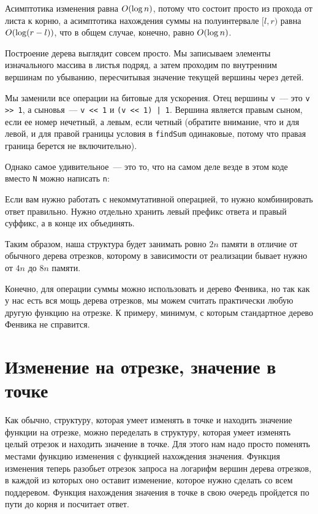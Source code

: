 Асимптотика изменения равна $O(\log n)$, потому что состоит просто из прохода от листа к корню, а асимптотика нахождения суммы на полуинтервале $[l, r)$ равна $O(\log (r - l))$, что в общем случае, конечно, равно $O(\log n)$.

Построение дерева выглядит совсем просто. Мы записываем элементы изначального массива в листья подряд, а затем проходим по внутренним вершинам по убыванию, пересчитывая значение текущей вершины через детей.



Мы заменили все операции на битовые для ускорения. Отец вершины \verb+v+~--- это \verb+v >> 1+, а сыновья~--- \verb+v << 1+ и \verb+(v << 1) | 1+. Вершина является правым сыном, если ее номер нечетный, а левым, если четный (обратите внимание, что и для левой, и для правой границы условия в \verb+findSum+ одинаковые, потому что правая граница берется не включительно).

Однако самое удивительное~--- это то, что на самом деле везде в этом коде вместо \verb+N+ можно написать \verb+n+:



\begin{observation}
    Если вам нужно работать с некоммутативной операцией, то нужно комбинировать ответ правильно. Нужно отдельно хранить левый префикс ответа и правый суффикс, а в конце их объединять.
\end{observation}

Таким образом, наша структура будет занимать ровно $2n$ памяти в отличие от обычного дерева отрезков, которому в зависимости от реализации бывает нужно от $4n$ до $8n$ памяти.

Конечно, для операции суммы можно использовать и дерево Фенвика, но так как у нас есть вся мощь дерева отрезков, мы можем считать практически любую другую функцию на отрезке. К примеру, минимум, с которым стандартное дерево Фенвика не справится.

\section{Изменение на отрезке, значение в точке}

Как обычно, структуру, которая умеет изменять в точке и находить значение функции на отрезке, можно переделать в структуру, которая умеет изменять целый отрезок и находить значение в точке. Для этого нам надо просто поменять местами функцию изменения с функцией нахождения значения. Функция изменения теперь разобьет отрезок запроса на логарифм вершин дерева отрезков, в каждой из которых оно оставит изменение, которое нужно сделать со всем поддеревом. Функция нахождения значения в точке в свою очередь пройдется по пути до корня и посчитает ответ.

